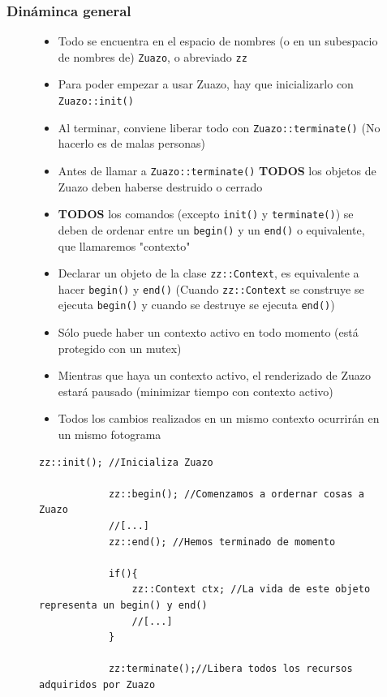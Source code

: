 \documentclass{beamer}
\begin{document}
\begin{frame} \frametitle{Dináminca general}
	\begin{figure}
		 \begin{itemize}
			\item{Todo se encuentra en el espacio de nombres (o en un subespacio de nombres de)  \texttt{Zuazo}, o abreviado \texttt{zz}}	
			\item{Para poder empezar a usar Zuazo, hay que inicializarlo con \texttt{Zuazo::init()}} 
			\item{Al terminar, conviene liberar todo con \texttt{Zuazo::terminate()} (No hacerlo es de malas personas)} 
			\item{Antes de llamar a \texttt{Zuazo::terminate()} \textbf{TODOS} los objetos de Zuazo deben haberse destruido o cerrado} 
			\item{\textbf{TODOS} los comandos (excepto  \texttt{init()} y  \texttt{terminate()}) se deben de ordenar entre un  \texttt{begin()} y un  \texttt{end()} o equivalente, que llamaremos "contexto"}
			\item{Declarar un objeto de la clase \texttt{zz::Context}, es equivalente a hacer \texttt{begin()} y \texttt{end()} (Cuando  \texttt{zz::Context} se construye se ejecuta  \texttt{begin()} y cuando se destruye se ejecuta  \texttt{end()})}
			\item{Sólo puede haber un contexto activo en todo momento (está protegido con un mutex)} 
			\item{Mientras que haya un contexto activo, el renderizado de Zuazo estará pausado (minimizar tiempo con contexto activo)} 	
			\item{Todos los cambios realizados en un mismo contexto ocurrirán en un mismo fotograma} 
		\end{itemize}
		\begin{lstlisting}[style=micpp, frame=single]
			zz::init(); //Inicializa Zuazo

			zz::begin(); //Comenzamos a ordernar cosas a Zuazo
			//[...]
			zz::end(); //Hemos terminado de momento

			if(){
				zz::Context ctx; //La vida de este objeto representa un begin() y end()
				//[...]
			}

			zz:terminate();//Libera todos los recursos adquiridos por Zuazo
		\end{lstlisting}
	\end{figure}
\end{frame}
\end{document}
